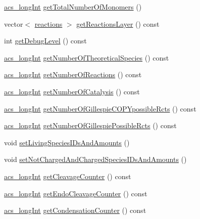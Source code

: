 \begin{DoxyCompactItemize}
\hyperlink{acs__headers_8h_a19319d75f02db4308bc5c0026d98cd85}{acs\-\_\-long\-Int} \hyperlink{classenvironment_aa8c94019533639038f99587fc2b029dc}{get\-Total\-Number\-Of\-Monomers} ()
\item 
vector$<$ \hyperlink{classreactions}{reactions} $>$ \hyperlink{classenvironment_a3d44f3f4a8f9010fa99c49f5cc961416}{get\-Reactions\-Layer} () const 
\item 
int \hyperlink{classenvironment_a2de42381b0b9cba889bbb95c1456cfe5}{get\-Debug\-Level} () const 
\item 
\hyperlink{acs__headers_8h_a19319d75f02db4308bc5c0026d98cd85}{acs\-\_\-long\-Int} \hyperlink{classenvironment_ab98d4ad28b101f08279aa3458d5dfda3}{get\-Number\-Of\-Theoretical\-Species} () const 
\item 
\hyperlink{acs__headers_8h_a19319d75f02db4308bc5c0026d98cd85}{acs\-\_\-long\-Int} \hyperlink{classenvironment_abf45b6406f8c0e95c4c5edf6b374e112}{get\-Number\-Of\-Reactions} () const 
\item 
\hyperlink{acs__headers_8h_a19319d75f02db4308bc5c0026d98cd85}{acs\-\_\-long\-Int} \hyperlink{classenvironment_a21609adb1a83a4cb7eaec78a90acd624}{get\-Number\-Of\-Catalysis} () const 
\item 
\hyperlink{acs__headers_8h_a19319d75f02db4308bc5c0026d98cd85}{acs\-\_\-long\-Int} \hyperlink{classenvironment_a79255c58733b08407dc81d89e306d74f}{get\-Number\-Of\-Gillespie\-C\-O\-P\-Ypossible\-Rcts} () const 
\item 
\hyperlink{acs__headers_8h_a19319d75f02db4308bc5c0026d98cd85}{acs\-\_\-long\-Int} \hyperlink{classenvironment_a3140242018e8232dfa89a127ac1bb282}{get\-Number\-Of\-Gillespie\-Possible\-Rcts} () const 
\item 
void \hyperlink{classenvironment_a4fb98d7cad06ef479e2643785231feb9}{set\-Living\-Species\-I\-Ds\-And\-Amounts} ()
\item 
void \hyperlink{classenvironment_ac5528a39937cdc76f0dd23c27542110c}{set\-Not\-Charged\-And\-Charged\-Species\-I\-Ds\-And\-Amounts} ()
\item 
\hyperlink{acs__headers_8h_a19319d75f02db4308bc5c0026d98cd85}{acs\-\_\-long\-Int} \hyperlink{classenvironment_a8b9a3b5c5a2f86206c5fb124352e366e}{get\-Cleavage\-Counter} () const 
\item 
\hyperlink{acs__headers_8h_a19319d75f02db4308bc5c0026d98cd85}{acs\-\_\-long\-Int} \hyperlink{classenvironment_aa2ded3c5ba8c4ce41ee86399dc616d4a}{get\-Endo\-Cleavage\-Counter} () const 
\item 
\hyperlink{acs__headers_8h_a19319d75f02db4308bc5c0026d98cd85}{acs\-\_\-long\-Int} \hyperlink{classenvironment_a0fc62131bf552c2a995c7ddc461828cd}{get\-Condensation\-Counter} () const 

\end{DoxyCompactItemize}
